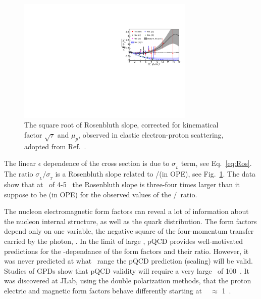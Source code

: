 \begin{figure}[h]
\includegraphics[trim = 0mm 0mm 0mm 40mm, width = 0.75\textwidth]{Plots/Fig1.pdf}
\caption{The square root of Rosenbluth slope, corrected for kinematical factor $\sqrt {\tau}$ and $\mu_p$, observed in elastic electron-proton scattering,
adopted from Ref.~\cite{Christy2020ab}.}
\label{pic:Fig1}
\end{figure}

The linear $\epsilon$ dependence of the cross section is due to $\sigma_{_L}$ term, see Eq.~\ref{eq:Ros}.
The ratio $\sigma_{_L}/\sigma_{_T}$ is a Rosenbluth slope related to \gef/\gmf (in OPE), see Fig.~\ref{pic:Fig1}.
The data show that at \qsq~of 4-5 \gevcsq~the Rosenbluth slope is three-four times larger than it suppose to be (in OPE) for
the observed values of the \gep/\gmp~ratio.

%
The nucleon electromagnetic form factors can reveal a lot of information about the nucleon internal structure, as well as the quark distribution. 
The form factors depend only on one variable, the negative square of the four-momentum transfer carried by the photon, \qsq. 
In the limit of large \qsq, pQCD provides well-motivated predictions for the \qsq-dependance of the form factors and their ratio. 
However, it was never predicted at what \qsq~range the pQCD prediction (scaling) will be valid.
Studies of GPDs show that pQCD validity will require a very large \qsq~of 100~\gevcsq. 
It was discovered at JLab, using the double polarization methods, that the proton electric and magnetic form factors behave differently starting at \qsq~ $\approx$ 1~\gevcsq.
 
